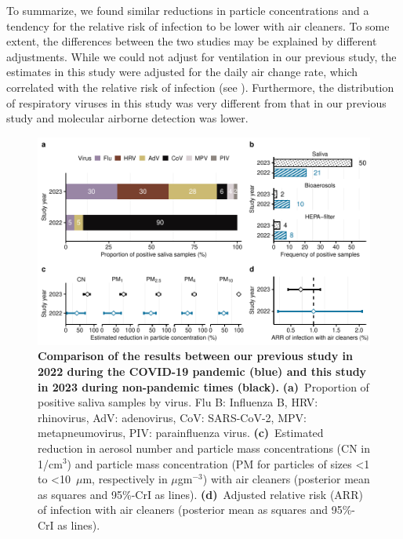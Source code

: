 
To summarize, we found similar reductions in particle concentrations and a tendency for the relative risk of infection to be lower with air cleaners. To some extent, the differences between the two studies may be explained by different adjustments. While we could not adjust for ventilation in our previous study, the estimates in this study were adjusted for the daily air change rate, which correlated with the relative risk of infection (see ). Furthermore, the distribution of respiratory viruses in this study was very different from that in our previous study and molecular airborne detection was lower.

\begin{figure}[!htpb]
    \includegraphics[width=\linewidth]{../../results/comparison.pdf} 
    \caption{\textbf{Comparison of the results between our previous study in 2022 during the COVID-19 pandemic (blue) and this study in 2023 during non-pandemic times (black).} \textbf{(a)}~Proportion of positive saliva samples by virus. Flu B: Influenza B, HRV: rhinovirus, AdV: adenovirus, CoV: SARS-CoV-2, MPV: metapneumovirus, PIV: parainfluenza virus. \textbf{(c)}~Estimated reduction in aerosol number and particle mass concentrations (CN in 1/cm$^3$) and particle mass concentration (PM for particles of sizes <1 to <10~$\mu$m, respectively in $\mu$gm$^{-3}$) with air cleaners (posterior mean as squares and 95\%-CrI as lines). \textbf{(d)}~Adjusted relative risk (ARR) of infection with air cleaners (posterior mean as squares and 95\%-CrI as lines).}
    \label{fig:comparison}
\end{figure}



